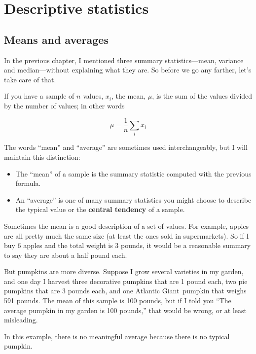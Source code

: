 \documentclass[12pt]{book}
\begin{document}
\chapter{Descriptive statistics}
\label{descriptive}

\section{Means and averages}
\label{mean}

In the previous chapter, I mentioned three summary statistics---mean,
variance and median---without explaining what they are.  So before
we go any farther, let's take care of that.

If you have a sample of $n$ values, $x_i$, the mean, $\mu$, is
the sum of the values divided by the number of values; in other words

\[ \mu = \frac{1}{n} \sum_i x_i \]

The words ``mean'' and ``average'' are sometimes used interchangeably,
but I will maintain this distinction:

\begin{itemize}

\item The ``mean'' of a sample is the summary statistic computed with
  the previous formula.

\item An ``average'' is one of many summary statistics you might
  choose to describe the typical value or the
  {\bf central tendency} of a sample.

\end{itemize}

Sometimes the mean is a good description of a set of values.  For
example, apples are all pretty much the same size (at least the ones
sold in supermarkets).  So if I buy 6 apples and the total weight is 3
pounds, it would be a reasonable summary to say they are about a half
pound each.

But pumpkins are more diverse.  Suppose I grow several varieties in my
garden, and one day I harvest three decorative pumpkins that are 1
pound each, two pie pumpkins that are 3 pounds each, and one Atlantic
Giant\textregistered~pumpkin that weighs 591 pounds.  The mean of
this sample is 100 pounds, but if I told you ``The average pumpkin
in my garden is 100 pounds,'' that would be wrong, or at least
misleading.

In this example, there is no meaningful average because
there is no typical pumpkin.
\end{document}
